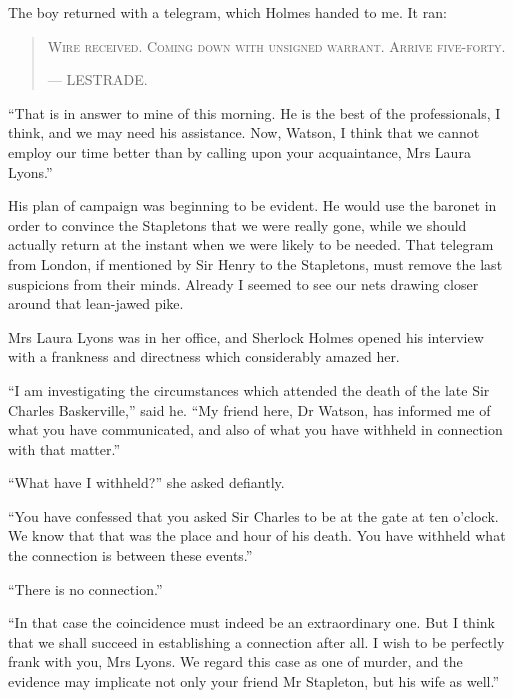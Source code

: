 \documentclass[paper=a5,BCOR=7mm,twoside,DIV=calc,12pt,usegeometry,openany,chapterprefix,endperiod,headings=big]{scrbook} %
\begin{document}
The boy returned with a telegram, which Holmes handed to me. It ran: 
\begin{samepage}
\blockquote{
\textsc{Wire received. Coming down with unsigned warrant. Arrive five-forty.}
\begin{flushright}
---  {\small\scshape LESTRADE.}
\end{flushright}
}
\end{samepage}

\enquote{That is in answer to mine of this morning. He is the best of the professionals, I think, and we may need his assistance. Now, Watson, I think that we cannot employ our time better than by calling upon your acquaintance, Mrs Laura Lyons.}

His plan of campaign was beginning to be evident. He would use the baronet in order to convince the Stapletons that we were really gone, while we should actually return at the instant when we were likely to be needed. That telegram from London, if mentioned by Sir Henry to the Stapletons, must remove the last suspicions from their minds. Already I seemed to see our nets drawing closer around that lean-jawed pike.

Mrs Laura Lyons was in her office, and Sherlock Holmes opened his interview with a frankness and directness which considerably amazed her.

\enquote{I am investigating the circumstances which attended the death of the late Sir Charles Baskerville,} said he. \enquote{My friend here, Dr Watson, has informed me of what you have communicated, and also of what you have withheld in connection with that matter.}

\enquote{What have I withheld?} she asked defiantly.

\enquote{You have confessed that you asked Sir Charles to be at the gate at ten o'clock. We know that that was the place and hour of his death. You have withheld what the connection is between these events.}

\enquote{There is no connection.}

\enquote{In that case the coincidence must indeed be an extraordinary one. But I think that we shall succeed in establishing a connection after all. I wish to be perfectly frank with you, Mrs Lyons. We regard this case as one of murder, and the evidence may implicate not only your friend Mr Stapleton, but his wife as well.}
\end{document}
